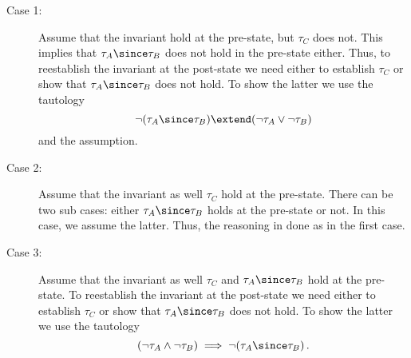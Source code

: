 \begin{description}
\item[Case 1:]
Assume that the invariant hold at the pre-state, but 
$\tau_C$ does not.
This implies that $\tau_A \since \tau_B$ does not hold in the pre-state either.
Thus, to reestablish the invariant at the post-state we need either to establish $\tau_C$
or show that $\tau_A \since \tau_B$ does not hold.
To show the latter we use the tautology
\[
\neg (\tau_A \since \tau_B) \extend (\neg  \tau_A \lor \neg \tau_B)
\]
and the assumption.
\item[Case 2:]
Assume that the invariant as well $\tau_C$ hold at the pre-state.
There can be two sub cases: either $\tau_A \since \tau_B$ holds at the pre-state or not.
In this case, we assume the latter. Thus, the reasoning in done as in the first case.
\item[Case 3:]
Assume that the invariant as well $\tau_C$ and $\tau_A \since \tau_B$ hold at the pre-state.
To reestablish the invariant at the post-state we need either to establish $\tau_C$
or show that $\tau_A \since \tau_B$ does not hold.
To show the latter we use the tautology
\[
(\neg  \tau_A \land \neg \tau_B) \implies \neg (\tau_A \since \tau_B)\,.
\]
\end{description}


